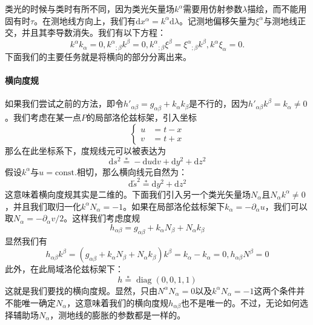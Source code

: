 \documentclass[hyperref, UTF8, a4paper]{ctexart}
\begin{document}
类光的时候与类时有所不同，因为类光矢量场$k^{\alpha }$需要用仿射参数$\lambda $描绘，而不能用固有时$\tau $。在测地线方向上，我们有$\mathrm{d} x^{\alpha } =k^{\alpha }\mathrm{d} \lambda $。记测地偏移矢量为$\xi ^{\alpha }$与测地线正交，并且其李导数消失。我们有以下方程：
\begin{equation*}
	k^{\alpha } k_{\alpha } =0,k^{\alpha }{}_{;\beta } k^{\beta } =0,k^{\alpha }{}_{;\beta } \xi ^{\beta } =\xi ^{\alpha }{}_{;\beta } k^{\beta } ,k^{\alpha } \xi _{\alpha } =0.
\end{equation*}
下面我们的主要任务就是将横向的部分分离出来。
\paragraph{横向度规}

如果我们尝试之前的方法，即令$h'_{\alpha \beta } =g_{\alpha \beta } +k_{\alpha } k_{\beta }$是不行的，因为$h'_{\alpha \beta } k^{\beta } =k_{\alpha } \neq 0$。我们考虑在某一点$P$的局部洛伦兹标架，引入坐标
\begin{equation*}
	\begin{cases}
		u & =t-x\\
		v & =t+x
	\end{cases}
\end{equation*}
那么在此坐标系下，度规线元可以被表达为
\begin{equation*}
	\mathrm{d} s^{2}\stackrel{*}{=} -\mathrm{d} u\mathrm{d} v+\mathrm{d} y^{2} +\mathrm{d} z^{2}
\end{equation*}
假设$k^{\alpha }$与$u=\mathrm{const.}$相切，那么横向线元自然为：
\begin{equation*}
	\mathrm{d}\tilde{s}^{2}\mathrm{\stackrel{*}{=} d} y^{2} +\mathrm{d} z^{2}
\end{equation*}
这意味着横向度规其实是二维的。下面我们引入另一个类光矢量场$N_{\alpha }$且$N_{\alpha } k^{\alpha } \neq 0$，并且我们取归一化$k^{\alpha } N_{\alpha } =-1$。如果在局部洛伦兹标架下$k_{\alpha } =-\partial _{\alpha } u$，我们可以取$N_{\alpha } =-\partial _{\alpha } v/2$。这样我们考虑度规
\begin{equation*}
	h_{\alpha \beta } =g_{\alpha \beta } +k_{\alpha } N_{\beta } +N_{\alpha } k_{\beta }
\end{equation*}
显然我们有
\begin{equation*}
	h_{\alpha \beta } k^{\beta } =(g_{\alpha \beta } +k_{\alpha } N_{\beta } +N_{\alpha } k_{\beta } )k^{\beta } =k_{\alpha } -k_{\alpha } =0,h_{\alpha \beta } N^{\beta } =0
\end{equation*}
此外，在此局域洛伦兹标架下：
\begin{equation*}
	h\stackrel{*}{=}\operatorname{diag}( 0,0,1,1)
\end{equation*}
这就是我们要找的横向度规。显然，只由$N^{\alpha } N_{\alpha } =0$以及$k^{\alpha } N_{\alpha } =-1$这两个条件并不能唯一确定$N_{\alpha }$，这意味着我们的横向度规$h_{\alpha \beta }$也不是唯一的。不过，无论如何选择辅助场$N_{\alpha }$，测地线的膨胀的参数都是一样的。
\end{document}
